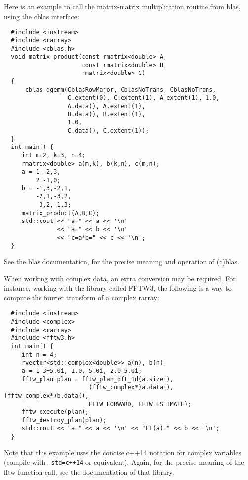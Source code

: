 \documentclass[11pt,twoside]{article}
\begin{document}
Here is an example to call the matrix-matrix multiplication routine
from blas, using the cblas interface:
\vspace{-5pt}\begin{framed}\vspace{-14pt}%
\begin{verbatim}
  #include <iostream>
  #include <rarray>
  #include <cblas.h>
  void matrix_product(const rmatrix<double> A,
                      const rmatrix<double> B,
                      rmatrix<double> C)
  {
      cblas_dgemm(CblasRowMajor, CblasNoTrans, CblasNoTrans,
                  C.extent(0), C.extent(1), A.extent(1), 1.0,
                  A.data(), A.extent(1),
                  B.data(), B.extent(1),
                  1.0,
                  C.data(), C.extent(1));
  }
  int main() {
     int m=2, k=3, n=4;
     rmatrix<double> a(m,k), b(k,n), c(m,n);
     a = 1,-2,3,
         2,-1,0;
     b = -1,3,-2,1,
         -2,1,-3,2,
         -3,2,-1,3;
     matrix_product(A,B,C);
     std::cout << "a=" << a << '\n'
               << "a=" << b << '\n' 
               << "c=a*b=" << c << '\n';
  }
\end{verbatim}%
\vspace{-14pt}\end{framed}\vspace{-8pt}
\noindent
See the blas documentation, for the precise meaning and operation of
(c)blas.

When working with complex data, an extra conversion may be
required. For instance, working with the library called FFTW3, the
following is a way to compute the fourier transform of a complex
rarray:
\vspace{-5pt}\begin{framed}\vspace{-14pt}%
\begin{verbatim}
  #include <iostream>
  #include <complex>
  #include <rarray>
  #include <fftw3.h>
  int main() {
     int n = 4;
     rvector<std::complex<double>> a(n), b(n);
     a = 1.3+5.0i, 1.0, 5.0i, 2.0-5.0i;
     fftw_plan plan = fftw_plan_dft_1d(a.size(),
                        (fftw_complex*)a.data(), (fftw_complex*)b.data(), 
                        FFTW_FORWARD, FFTW_ESTIMATE);
     fftw_execute(plan);
     fftw_destroy_plan(plan);
     std::cout << "a=" << a << '\n' << "FT(a)=" << b << '\n';
  }
\end{verbatim}%
\vspace{-14pt}\end{framed}\vspace{-8pt}
\noindent
Note that this example uses the concise c++14 notation for complex
variables (compile with \texttt{-std=c++14} or equivalent). Again, for the precise meaning of the fftw function call, see the documentation of
that library.
\end{document}
